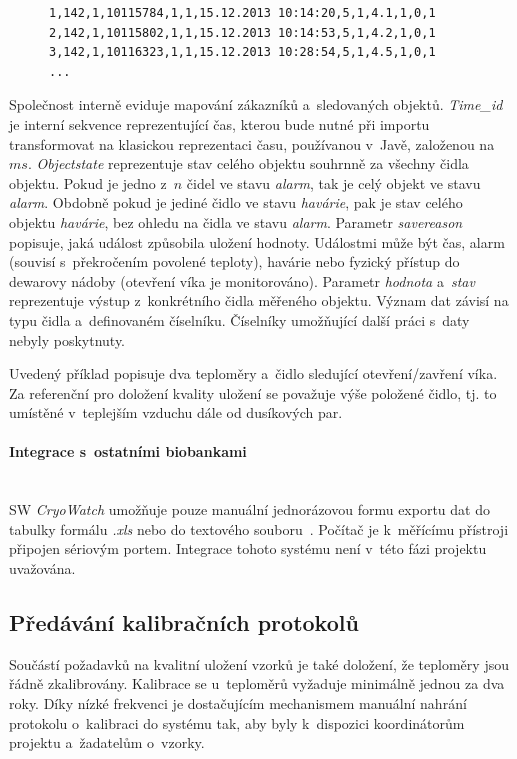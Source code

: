 \documentclass[11pt, draft, oneside]{fithesis2}
\newcommand{\paragraphNewLine}[1]{\paragraph*{#1}\mbox{}\\}
\begin{document}

\begin{figure}[h!]
\centering
\begin{BVerbatim}
1,142,1,10115784,1,1,15.12.2013 10:14:20,5,1,4.1,1,0,1
2,142,1,10115802,1,1,15.12.2013 10:14:53,5,1,4.2,1,0,1
3,142,1,10116323,1,1,15.12.2013 10:28:54,5,1,4.5,1,0,1
...
\end{BVerbatim}
\end{figure}

Společnost interně eviduje mapování zákazníků a~sledovaných objektů. 
\textit{Time\_id} je interní sekvence reprezentující čas, kterou bude nutné při importu transformovat na klasickou reprezentaci času, používanou v~Javě, založenou na $ms$. \textit{Objectstate} reprezentuje stav celého objektu souhrnně za všechny čidla objektu. Pokud je jedno z~$n$ čidel ve stavu \textit{alarm}, tak je celý objekt ve stavu \textit{alarm}. Obdobně pokud je jediné čidlo ve stavu \textit{havárie}, pak je stav celého objektu \textit{havárie}, bez ohledu na čidla ve stavu \textit{alarm}. Parametr \textit{savereason} popisuje, jaká událost způsobila uložení hodnoty. Událostmi může být čas, alarm (souvisí s~překročením povolené teploty), havárie nebo fyzický přístup do dewarovy nádoby (otevření víka je monitorováno). Parametr \textit{hodnota} a~\textit{stav} reprezentuje výstup z~konkrétního čidla měřeného objektu. Význam dat závisí na typu čidla a~definovaném číselníku. Číselníky umožňující další práci s~daty nebyly poskytnuty.

Uvedený příklad popisuje dva teploměry a~čidlo sledující otevření/zavření víka. Za referenční pro doložení kvality uložení se považuje výše položené čidlo, tj. to umístěné v~teplejším vzduchu dále od dusíkových par. 

\paragraphNewLine{Integrace s~ostatními biobankami}
SW \textit{CryoWatch} umožňuje pouze manuální jednorázovou formu exportu dat do tabulky formálu \textit{.xls} nebo do textového souboru~\cite{M355CE}. Počítač je k~měřícímu přístroji připojen sériovým portem. Integrace tohoto systému není v~této fázi projektu uvažována. 

\subsection{Předávání kalibračních protokolů}
Součástí požadavků na kvalitní uložení vzorků je také doložení, že teploměry jsou řádně zkalibrovány. Kalibrace se u~teploměrů vyžaduje minimálně jednou za dva roky. Díky nízké frekvenci je dostačujícím mechanismem manuální nahrání protokolu o~kalibraci do systému tak, aby byly k~dispozici koordinátorům projektu a~žadatelům o~vzorky.
\end{document}
